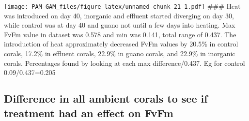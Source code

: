 \documentclass[
]{article}
\begin{document}
\texttt{[image: PAM-GAM\_files/figure-latex/unnamed-chunk-21-1.pdf]}
\#\#\# Heat was introduced on day 40, inorganic and effluent started
diverging on day 30, while control was at day 40 and guano not until a
few days into heating. Max FvFm value in dataset was 0.578 and min was
0.141, total range of 0.437. The introduction of heat approximately
decreased FvFm values by 20.5\% in control corals, 17.2\% in effluent
corals, 22.9\% in guano corals, and 22.9\% in inorganic corals.
Percentages found by looking at each max difference/0.437. Eg for
control 0.09/0.437=0.205

\hypertarget{difference-in-all-ambient-corals-to-see-if-treatment-had-an-effect-on-fvfm-2}{%
\subsection{Difference in all ambient corals to see if treatment had an
effect on
FvFm}\label{difference-in-all-ambient-corals-to-see-if-treatment-had-an-effect-on-fvfm-2}}
\end{document}
